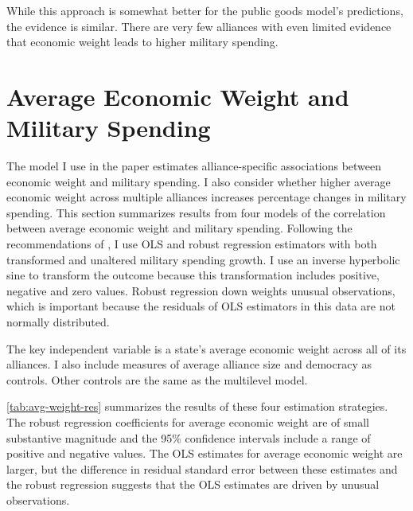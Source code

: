 \documentclass[12pt]{article}
\begin{document}
While this approach is somewhat better for the public goods model's predictions, the evidence is similar. 
There are very few alliances with even limited evidence that economic weight leads to higher military spending. 



\section{Average Economic Weight and Military Spending}


The model I use in the paper estimates alliance-specific associations between economic weight and military spending. 
I also consider whether higher average economic weight across multiple alliances increases percentage changes in military spending. 
This section summarizes results from four models of the correlation between average economic weight and military spending. 
Following the recommendations of \citet{RaineyBaissa2020}, I use OLS and robust regression estimators with both transformed and unaltered military spending growth.  
I use an inverse hyperbolic sine to transform the outcome because this transformation includes positive, negative and zero values. 
Robust regression down weights unusual observations, which is important because the residuals of OLS estimators in this data are not normally distributed. 


The key independent variable is a state's average economic weight across all of its alliances. 
I also include measures of average alliance size and democracy \citep{DigiuseppePoast2016} as controls. 
Other controls are the same as the multilevel model.  


\autoref{tab:avg-weight-res} summarizes the results of these four estimation strategies. 
The robust regression coefficients for average economic weight are of small substantive magnitude and the 95\% confidence intervals include a range of positive and negative values. 
The OLS estimates for average economic weight are larger, but the difference in residual standard error between these estimates and the robust regression suggests that the OLS estimates are driven by unusual observations. 
\end{document}
